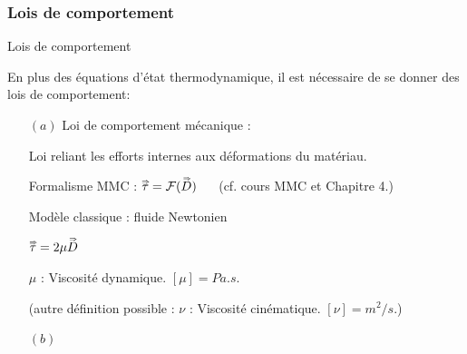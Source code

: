 \subsubsection{Lois de comportement}

\begin{frame}{Lois de comportement}

En plus des équations d'état thermodynamique, il est nécessaire de se donner des lois de comportement:

\begin{itemize}
\item[$(a)$]  Loi de comportement mécanique :

Loi reliant les efforts internes aux déformations du matériau.
\smallskip \pause 

Formalisme MMC :  $\accentset{\Rightarrow}{\tau} = {\cal F}  ( \accentset{\Rightarrow}{ D} )$ $ \quad$ (cf. cours MMC et  Chapitre 4.)

\smallskip \pause 

Modèle classique : fluide Newtonien 

 $\accentset{\Rightarrow}{\tau} = 2 \mu \accentset{\Rightarrow}{D} $

$ \mu$ : Viscosité dynamique. $[\mu] = Pa. s$.

(autre définition possible : $ \nu$ : Viscosité cinématique. $[\nu] = m^2 /s$.)

\item[$(b)$]  
\color{gris}{
Loi de comportement thermique :

Loi reliant $\vec q$ (flux de chaleur) à la distribution de $T$.

\smallskip \pause 

Modèle classique : loi de Fourrier $\vec q = - \lambda \nabla T$ (cf. cours transferts thermique).
}
\end{itemize}


\end{frame}

